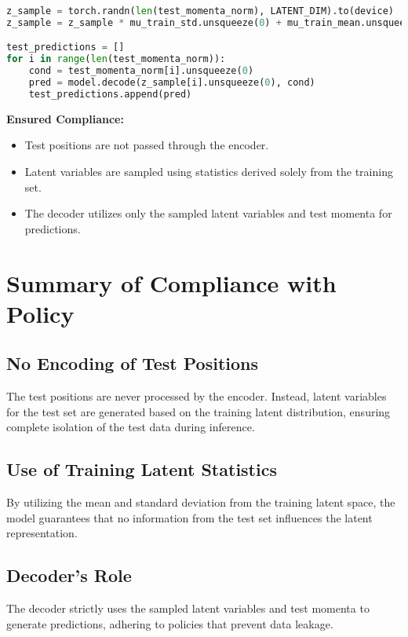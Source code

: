 \documentclass[10pt]{article}
\begin{document}
\begin{lstlisting}[language=Python, caption=Decoding Procedure]
z_sample = torch.randn(len(test_momenta_norm), LATENT_DIM).to(device)
z_sample = z_sample * mu_train_std.unsqueeze(0) + mu_train_mean.unsqueeze(0)

test_predictions = []
for i in range(len(test_momenta_norm)):
    cond = test_momenta_norm[i].unsqueeze(0)
    pred = model.decode(z_sample[i].unsqueeze(0), cond)
    test_predictions.append(pred)
\end{lstlisting}

\textbf{Ensured Compliance:}
\begin{itemize}
    \item Test positions are not passed through the encoder.
    \item Latent variables are sampled using statistics derived solely from the training set.
    \item The decoder utilizes only the sampled latent variables and test momenta for predictions.
\end{itemize}

\section{Summary of Compliance with Policy}

\subsection{No Encoding of Test Positions}
The test positions are never processed by the encoder. Instead, latent variables for the test set are generated based on the training latent distribution, ensuring complete isolation of the test data during inference.

\subsection{Use of Training Latent Statistics}
By utilizing the mean and standard deviation from the training latent space, the model guarantees that no information from the test set influences the latent representation.

\subsection{Decoder's Role}
The decoder strictly uses the sampled latent variables and test momenta to generate predictions, adhering to policies that prevent data leakage.
\end{document}
